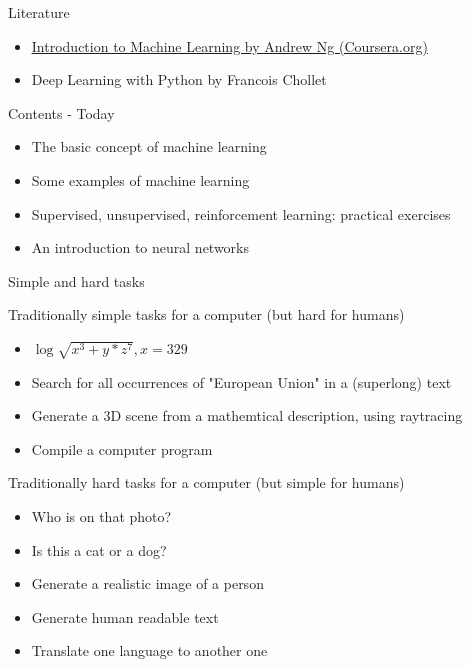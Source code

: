 \documentclass[color=usenames,dvipsnames]{beamer}
\begin{document}
\begin{frame}{Literature}

\begin{itemize}
	\item \href{https://www.coursera.org/learn/machine-learning}{\underline{Introduction to Machine Learning by Andrew Ng (Coursera.org)}}
	\item Deep Learning with Python by Francois Chollet
\end{itemize}

\end{frame}




\begin{frame}{Contents - Today} 

\begin{itemize}
	\item The basic concept of machine learning
	\item Some examples of machine learning
	\item Supervised, unsupervised, reinforcement learning: practical exercises
	
	\item An introduction to neural networks 



\end{itemize}





\end{frame}

\begin{frame}{Simple and hard tasks} 

Traditionally simple tasks for a computer (but hard for humans)

\begin{itemize}
	\item $\log{\sqrt{x^3+y*z^7}},x = 329$
	\item Search for all occurrences of "European Union" in a (superlong) text
	\item Generate a 3D scene from a mathemtical description, using raytracing
	\item Compile a computer program	
\end{itemize}	

Traditionally hard tasks for a computer (but simple for humans)
\begin{itemize}
	\item Who is on that photo?
	\item Is this a cat or a dog?
	\item Generate a realistic image of a person
	\item Generate human readable text
	\item Translate one language to another one		
\end{itemize}	

\end{frame}
\end{document}
